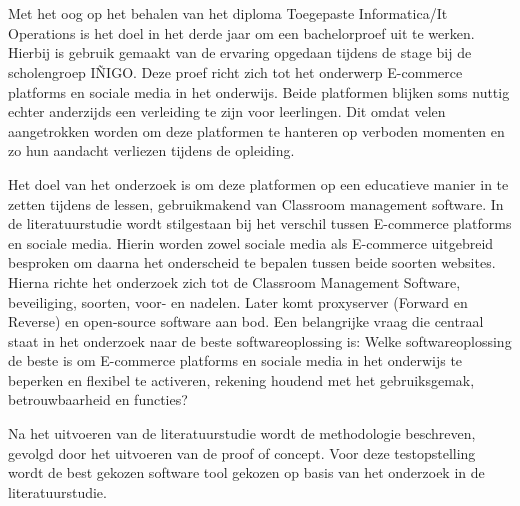
\chapter{}%
\label{ch:inleiding}

Met het oog op het behalen van het diploma Toegepaste Informatica/It Operations is het doel in het derde jaar om een bachelorproef uit te werken. Hierbij is gebruik gemaakt van de ervaring opgedaan tijdens de stage bij de scholengroep IÑIGO. Deze proef richt zich tot het onderwerp E-commerce platforms en sociale media in het onderwijs. Beide platformen blijken soms nuttig echter anderzijds een verleiding te zijn voor leerlingen. Dit omdat velen aangetrokken worden om deze platformen te hanteren op verboden momenten en zo hun aandacht verliezen tijdens de opleiding. \newline

Het doel van het onderzoek is om deze platformen op een educatieve manier in te zetten tijdens de lessen, gebruikmakend van Classroom management software. In de literatuurstudie wordt stilgestaan bij het verschil tussen E-commerce platforms en sociale media. Hierin worden zowel sociale media als E-commerce uitgebreid besproken om daarna het onderscheid te bepalen tussen beide soorten websites. Hierna richte het onderzoek zich tot de Classroom Management Software, beveiliging, soorten, voor- en nadelen. Later komt proxyserver (Forward en Reverse) en open-source software aan bod. Een belangrijke vraag die centraal staat in het onderzoek naar de beste softwareoplossing is: Welke softwareoplossing de beste is om E-commerce platforms en sociale media in het onderwijs te beperken en flexibel te activeren, rekening houdend met het gebruiksgemak, betrouwbaarheid en functies?\newline 

Na het uitvoeren van de literatuurstudie wordt de methodologie beschreven, gevolgd door het uitvoeren van de proof of concept. Voor deze testopstelling wordt de best gekozen software tool gekozen op basis van het onderzoek in de literatuurstudie. 

\section{}%
\label{sec:probleemstelling}

